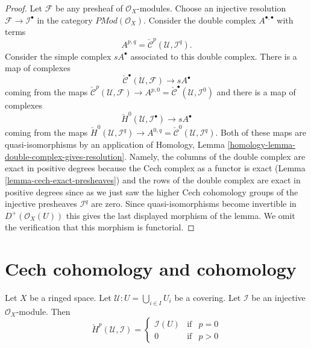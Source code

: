 \begin{proof}
\medskip\noindent
Let $\mathcal{F}$ be any presheaf of $\mathcal{O}_X$-modules.
Choose an injective resolution $\mathcal{F} \to \mathcal{I}^\bullet$
in the category $\textit{PMod}(\mathcal{O}_X)$.
Consider the double complex $A^{\bullet, \bullet}$ with terms
$$
A^{p, q} =
\check{\mathcal{C}}^p(\mathcal{U}, \mathcal{I}^q).
$$
Consider the simple complex $sA^\bullet$ associated to this double
complex. There is a map of complexes
$$
\check{\mathcal{C}}^\bullet(\mathcal{U}, \mathcal{F})
\longrightarrow
sA^\bullet
$$
coming from the maps
$\check{\mathcal{C}}^p(\mathcal{U}, \mathcal{F})
\to A^{p, 0} = \check{\mathcal{C}}^\bullet(\mathcal{U}, \mathcal{I}^0)$
and there is a map of complexes
$$
\check{H}^0(\mathcal{U}, \mathcal{I}^\bullet)
\longrightarrow
sA^\bullet
$$
coming from the maps
$\check{H}^0(\mathcal{U}, \mathcal{I}^q) \to
A^{0, q} = \check{\mathcal{C}}^0(\mathcal{U}, \mathcal{I}^q)$.
Both of these maps are quasi-isomorphisms by an application of
Homology, Lemma \ref{homology-lemma-double-complex-gives-resolution}.
Namely, the columns of the double complex are exact in positive degrees
because the Cech complex as a functor is exact
(Lemma \ref{lemma-cech-exact-presheaves})
and the rows of the double complex are exact in positive degrees
since as we just saw the higher Cech cohomology groups of the injective
presheaves $\mathcal{I}^q$ are zero.
Since quasi-isomorphisms become invertible
in $D^{+}(\mathcal{O}_X(U))$ this gives the last displayed morphism
of the lemma. We omit the verification that this morphism is
functorial.
\end{proof}





\section{Cech cohomology and cohomology}
\label{section-cech-cohomology-cohomology}

\begin{lemma}
\label{lemma-injective-trivial-cech}
Let $X$ be a ringed space.
Let $\mathcal{U} : U = \bigcup_{i \in I} U_i$ be a covering.
Let $\mathcal{I}$ be an injective $\mathcal{O}_X$-module.
Then
$$
\check{H}^p(\mathcal{U}, \mathcal{I}) =
\left\{
\begin{matrix}
\mathcal{I}(U) & \text{if} & p = 0 \\
0 & \text{if} & p > 0
\end{matrix}
\right.
$$
\end{lemma}

